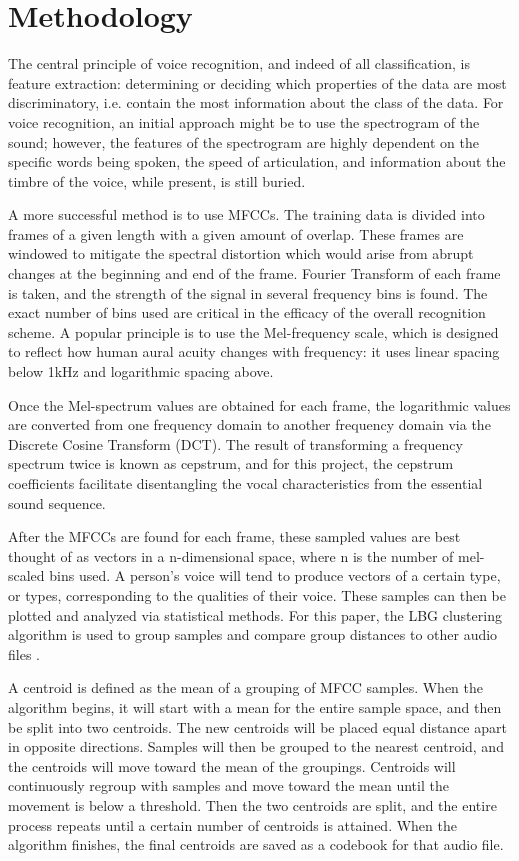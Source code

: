 \documentclass[conference]{IEEEtran}
\begin{document}
\section{Methodology}
The central principle of voice recognition, and indeed of all classification, is feature extraction: determining or deciding which properties of the data are most discriminatory, i.e. contain the most information about the class of the data. For voice recognition, an initial approach might be to use the spectrogram of the sound; however, the features of the spectrogram are highly dependent on the specific words being spoken, the speed of articulation, and information about the timbre of the voice, while present, is still buried.

A more successful method is to use MFCCs. The training data is divided into frames of a given length with a given amount of overlap. These frames are windowed to mitigate the spectral distortion which would arise from abrupt changes at the beginning and end of the frame. Fourier Transform of each frame is taken, and the strength of the signal in several frequency bins is found. The exact number of bins used are critical in the efficacy of the overall recognition scheme. A popular principle is to use the Mel-frequency scale, which is designed to reflect how human aural acuity changes with frequency: it uses linear spacing below 1kHz and logarithmic spacing above.

Once the Mel-spectrum values are obtained for each frame, the logarithmic values are converted from one frequency domain to another frequency domain via the Discrete Cosine Transform (DCT). The result of transforming a frequency spectrum twice is known as cepstrum, and for this project, the cepstrum coefficients facilitate disentangling the vocal characteristics from the essential sound sequence.

After the MFCCs are found for each frame, these sampled values are best thought of as vectors in a n-dimensional space, where n is the number of mel-scaled bins used. A person’s voice will tend to produce vectors of a certain type, or types, corresponding to the qualities of their voice. These samples can then be plotted and analyzed via statistical methods. For this paper, the LBG clustering algorithm is used to group samples and compare group distances to other audio files \cite{lgb_paper}.

A centroid is defined as the mean of a grouping of MFCC samples. When the algorithm begins, it will start with a mean for the entire sample space, and then be split into two centroids. The new centroids will be placed equal distance apart in opposite directions. Samples will then be grouped to the nearest centroid, and the centroids will move toward the mean of the groupings. Centroids will continuously regroup with samples and move toward the mean until the movement is below a threshold. Then the two centroids are split, and the entire process repeats until a certain number of centroids is attained. When the algorithm finishes, the final centroids are saved as a codebook for that audio file.
\end{document}
